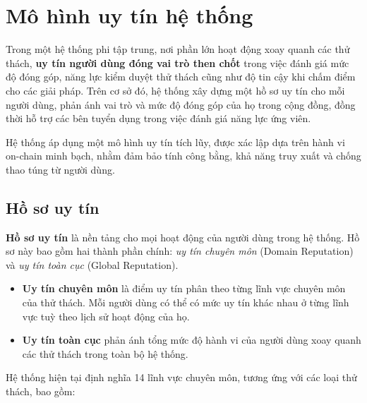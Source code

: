 \chapter{Mô hình uy tín hệ thống}

Trong một hệ thống phi tập trung, nơi phần lớn hoạt động xoay quanh các thử thách, \textbf{uy tín người dùng đóng vai trò then chốt} trong việc
đánh giá mức độ đóng góp, năng lực kiểm duyệt thử thách cũng như độ tin cậy khi chấm điểm cho các giải pháp. Trên cơ sở đó,
hệ thống xây dựng một hồ sơ uy tín cho mỗi người dùng, phản ánh vai trò và mức độ đóng góp của họ trong cộng đồng, đồng thời hỗ trợ các bên tuyển dụng trong việc đánh giá năng lực ứng viên.

Hệ thống áp dụng một mô hình uy tín tích lũy, được xác lập dựa trên hành vi on-chain minh bạch, nhằm đảm bảo tính công bằng, khả năng truy xuất và chống thao túng từ người dùng.

\section{Hồ sơ uy tín}

\textbf{Hồ sơ uy tín} là nền tảng cho mọi hoạt động của người dùng trong hệ thống. Hồ sơ này bao gồm hai thành phần chính: \textit{uy tín chuyên môn} (Domain Reputation) và \textit{uy tín toàn cục} (Global Reputation).

\begin{itemize}
  \item \textbf{Uy tín chuyên môn} là điểm uy tín phân theo từng lĩnh vực chuyên môn của thử thách. Mỗi người dùng có thể có mức uy tín khác nhau ở từng lĩnh vực tuỳ theo lịch sử hoạt động của họ.
  \item \textbf{Uy tín toàn cục} phản ánh tổng mức độ hành vi của người dùng xoay quanh các thử thách trong toàn bộ hệ thống.
\end{itemize}

Hệ thống hiện tại định nghĩa 14 lĩnh vực chuyên môn, tương ứng với các loại thử thách, bao gồm:

